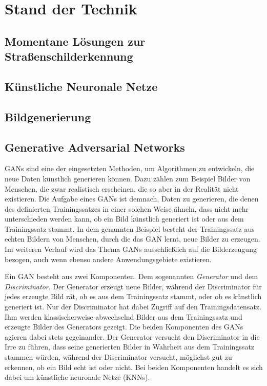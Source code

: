 \chapter{Stand der Technik}
\section{Momentane Lösungen zur Straßenschilderkennung}
\section{Künstliche Neuronale Netze}
\section{Bildgenerierung}
\section{Generative Adversarial Networks}
\acp{GAN} sind eine der eingesetzten Methoden, um Algorithmen zu entwickeln, die neue Daten künstlich generieren können. Dazu zählen zum Beispiel Bilder von Menschen, die zwar realistisch erscheinen, die so aber in der Realität nicht existieren. Die Aufgabe eines \acp{GAN} ist demnach, Daten zu generieren, die denen des definierten Trainingssatzes in einer solchen Weise ähneln, dass nicht mehr unterschieden werden kann, ob ein Bild künstlich generiert ist oder aus dem Trainingssatz stammt. In dem genannten Beispiel besteht der Trainingssatz aus echten Bildern von Menschen, durch die das \ac{GAN} lernt, neue Bilder zu erzeugen. Im weiteren Verlauf wird das Thema \acp{GAN} ausschließlich auf die Bilderzeugung bezogen, auch wenn ebenso andere Anwendungsgebiete existieren. \cite{visualApproach}

Ein \ac{GAN} besteht aus zwei Komponenten. Dem sogenannten \emph{Generator} und dem \emph{Discriminator}. Der Generator erzeugt neue Bilder, während der Discriminator für jedes erzeugte Bild rät, ob es aus dem Trainingssatz stammt, oder ob es künstlich generiert ist. Nur der Discriminator hat dabei Zugriff auf den Trainingsdatensatz. Ihm werden klassischerweise abwechselnd Bilder aus dem Trainingssatz und erzeugte Bilder des Generators gezeigt. Die beiden Komponenten des \acp{GAN} agieren dabei stets gegeinander. Der Generator versucht den Discriminator in die Irre zu führen, dass seine generierten Bilder in Wahrheit aus dem Trainingssatz stammen würden, während der Discriminator versucht, möglichst gut zu erkennen, ob ein Bild echt ist oder nicht. Bei beiden Komponenten handelt es sich dabei um künstliche neuronale Netze (\acp{KNN}). \cite{visualApproach}

